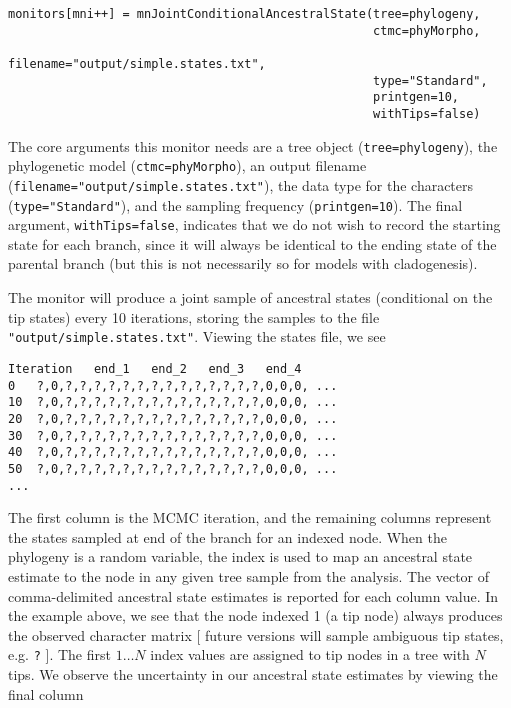 {\tt \begin{snugshade*}
\begin{lstlisting}
monitors[mni++] = mnJointConditionalAncestralState(tree=phylogeny,
                                                   ctmc=phyMorpho,
                                                   filename="output/simple.states.txt",
                                                   type="Standard",
                                                   printgen=10,
                                                   withTips=false)
\end{lstlisting}
\end{snugshade*}}

The core arguments this monitor needs are a tree object ({\tt tree=phylogeny}), the phylogenetic model ({\tt ctmc=phyMorpho}), an output filename ({\tt filename="output/simple.states.txt"}), the data type for the characters ({\tt type="Standard"}), and the sampling frequency ({\tt printgen=10}).
The final argument, {\tt withTips=false}, indicates that we do not wish to record the starting state for each branch, since it will always be identical to the ending state of the parental branch (but this is not necessarily so for models with cladogenesis).

The monitor will produce a joint sample of ancestral states (conditional on the tip states) every 10 iterations, storing the samples to the file {\tt "output/simple.states.txt"}.
Viewing the states file, we see

{\tt \begin{snugshade*}
\begin{lstlisting}
Iteration	end_1	end_2	end_3	end_4
0	?,0,?,?,?,?,?,?,?,?,?,?,?,?,?,?,0,0,0, ...
10	?,0,?,?,?,?,?,?,?,?,?,?,?,?,?,?,0,0,0, ...
20	?,0,?,?,?,?,?,?,?,?,?,?,?,?,?,?,0,0,0, ...
30	?,0,?,?,?,?,?,?,?,?,?,?,?,?,?,?,0,0,0, ...
40	?,0,?,?,?,?,?,?,?,?,?,?,?,?,?,?,0,0,0, ...
50	?,0,?,?,?,?,?,?,?,?,?,?,?,?,?,?,0,0,0, ...
...
\end{lstlisting}
\end{snugshade*}}

The first column is the MCMC iteration, and the remaining columns represent the states sampled at end of the branch for an indexed node.
When the phylogeny is a random variable, the index is used to map an ancestral state estimate to the node in any given tree sample from the analysis.
The vector of comma-delimited ancestral state estimates is reported for each column value.
In the example above, we see that the node indexed 1 (a tip node) always produces the observed character matrix [ future versions will sample ambiguous tip states, e.g. {\tt ?} ].
The first $1 \ldots N$ index values are assigned to tip nodes in a tree with $N$ tips.
We observe the uncertainty in our ancestral state estimates by viewing the final column

